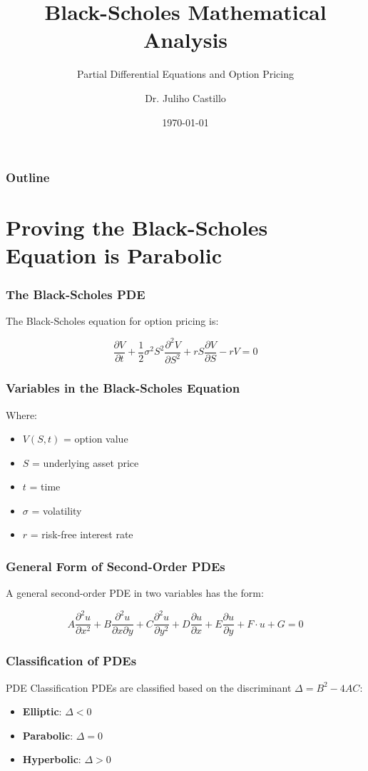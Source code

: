 \documentclass[aspectratio=169]{beamer}
\title{Black-Scholes Mathematical Analysis}
\subtitle{Partial Differential Equations and Option Pricing}
\author{Dr. Juliho Castillo}
\date{\today}
\begin{document}
\begin{frame}
\titlepage
\end{frame}

\begin{frame}
\frametitle{Outline}
\tableofcontents
\end{frame}

\section{Proving the Black-Scholes Equation is Parabolic}

\begin{frame}
\frametitle{The Black-Scholes PDE}
The Black-Scholes equation for option pricing is:

\[\frac{\partial V}{\partial t} + \frac{1}{2}\sigma^2 S^2 \frac{\partial^2 V}{\partial S^2} + rS \frac{\partial V}{\partial S} - rV = 0\]
\end{frame}

\begin{frame}
\frametitle{Variables in the Black-Scholes Equation}
Where:
\begin{itemize}
\item \(V(S,t)\) = option value
\item \(S\) = underlying asset price
\item \(t\) = time
\item \(\sigma\) = volatility
\item \(r\) = risk-free interest rate
\end{itemize}
\end{frame}

\begin{frame}
\frametitle{General Form of Second-Order PDEs}
A general second-order PDE in two variables has the form:

\[A\frac{\partial^2 u}{\partial x^2} + B\frac{\partial^2 u}{\partial x \partial y} + C\frac{\partial^2 u}{\partial y^2} + D\frac{\partial u}{\partial x} + E\frac{\partial u}{\partial y} + F \cdot u + G = 0\]
\end{frame}

\begin{frame}
\frametitle{Classification of PDEs}
\begin{block}{PDE Classification}
PDEs are classified based on the discriminant \(\Delta = B^2 - 4AC\):
\begin{itemize}
\item \textbf{Elliptic}: \(\Delta < 0\)
\item \textbf{Parabolic}: \(\Delta = 0\)
\item \textbf{Hyperbolic}: \(\Delta > 0\)
\end{itemize}
\end{block}
\end{frame}
\end{document}
